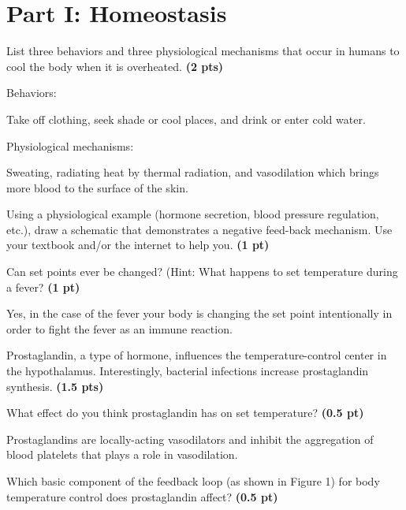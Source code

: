 \documentclass[12pt,a4paper]{article}
\begin{document}
\section*{Part I: Homeostasis}
\begin{enumerate}[font=\bfseries, wide]
    {\color{under}\item List three behaviors and three physiological mechanisms that occur in humans to cool the body when it is overheated. \textbf{(2 pts)}}
    \begin{enumerate}[font=\bfseries, wide]
        {\color{under}\item Behaviors:} Take off clothing, seek shade or cool places, and drink or enter cold water.

        {\color{under}\item Physiological mechanisms:} Sweating, radiating heat by thermal radiation, and vasodilation which brings more blood to the surface of the skin.

    \end{enumerate}
    {\color{under}\item Using a physiological example (hormone secretion, blood pressure regulation, etc.), draw a schematic that demonstrates a negative feed-back mechanism. Use your textbook and/or the internet to help you. \textbf{(1 pt)}}
    
    
    {\color{under}\item Can set points ever be changed? (Hint: What happens to set temperature during a fever? \textbf{(1 pt)}}

    Yes, in the case of the fever your body is changing the set point intentionally in order to fight the fever as an immune reaction.

    {\color{under}\item Prostaglandin, a type of hormone, influences the temperature-control center in the hypothalamus. Interestingly, bacterial infections increase prostaglandin synthesis. \textbf{(1.5 pts)}}
    \begin{enumerate}[font=\bfseries, wide]
        {\color{under}\item What effect do you think prostaglandin has on set temperature? \textbf{(0.5 pt)}}

        Prostaglandins are locally-acting vasodilators and inhibit the aggregation of blood platelets that plays a role in vasodilation.

        {\color{under}\item Which basic component of the feedback loop (as shown in Figure 1) for body temperature control does prostaglandin affect? \textbf{(0.5 pt)}}


\end{enumerate}
\end{enumerate}
\end{document}
